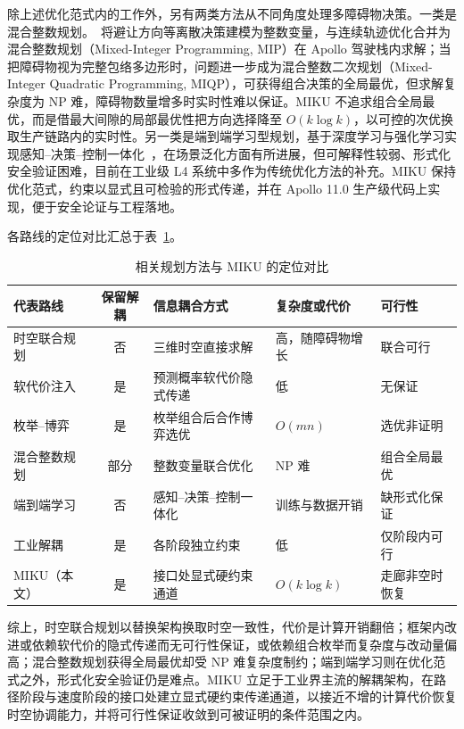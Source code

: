 \documentclass[a4paper,11pt]{ctexart}
\theoremstyle{definition}
\begin{document}
除上述优化范式内的工作外，另有两类方法从不同角度处理多障碍物决策。一类是混合整数规划。\citet{kessler2023}~将避让方向等离散决策建模为整数变量，与连续轨迹优化合并为混合整数规划（Mixed-Integer Programming, MIP）在 Apollo 驾驶栈内求解；当把障碍物视为完整包络多边形时，问题进一步成为混合整数二次规划（Mixed-Integer Quadratic Programming, MIQP），可获得组合决策的全局最优，但求解复杂度为 NP 难，障碍物数量增多时实时性难以保证。MIKU 不追求组合全局最优，而是借最大间隙的局部最优性把方向选择降至 $O(k\log k)$，以可控的次优换取生产链路内的实时性。另一类是端到端学习型规划，基于深度学习与强化学习实现感知--决策--控制一体化~\citep{li2024decision,zhang2021autonomous,alahi2016social,shalevshwartz2017rss}，在场景泛化方面有所进展，但可解释性较弱、形式化安全验证困难，目前在工业级 L4 系统中多作为传统优化方法的补充。MIKU 保持优化范式，约束以显式且可检验的形式传递，并在 Apollo 11.0 生产级代码上实现，便于安全论证与工程落地。

各路线的定位对比汇总于表~\ref{tab:related}。

\begin{table}[t]
\centering
\footnotesize
\setlength{\tabcolsep}{4pt}
\caption{相关规划方法与 MIKU 的定位对比}
\label{tab:related}
\begin{tabular}{@{}lcp{3.0cm}p{2.6cm}p{2.8cm}@{}}
\toprule
代表路线 & 保留解耦 & 信息耦合方式 & 复杂度或代价 & 可行性 \\
\midrule
时空联合规划 & 否 & 三维时空直接求解 & 高，随障碍物增长 & 联合可行 \\
软代价注入 & 是 & 预测概率软代价隐式传递 & 低 & 无保证 \\
枚举--博弈 & 是 & 枚举组合后合作博弈选优 & $O(mn)$ & 选优非证明 \\
混合整数规划 & 部分 & 整数变量联合优化 & NP 难 & 组合全局最优 \\
端到端学习 & 否 & 感知--决策--控制一体化 & 训练与数据开销 & 缺形式化保证 \\
工业解耦 & 是 & 各阶段独立约束 & 低 & 仅阶段内可行 \\
MIKU（本文） & 是 & 接口处显式硬约束通道 & $O(k\log k)$ & 走廊非空时恢复 \\
\bottomrule
\end{tabular}
\end{table}

综上，时空联合规划以替换架构换取时空一致性，代价是计算开销翻倍；框架内改进或依赖软代价的隐式传递而无可行性保证，或依赖组合枚举而复杂度与改动量偏高；混合整数规划获得全局最优却受 NP 难复杂度制约；端到端学习则在优化范式之外，形式化安全验证仍是难点。MIKU 立足于工业界主流的解耦架构，在路径阶段与速度阶段的接口处建立显式硬约束传递通道，以接近不增的计算代价恢复时空协调能力，并将可行性保证收敛到可被证明的条件范围之内。
\end{document}

